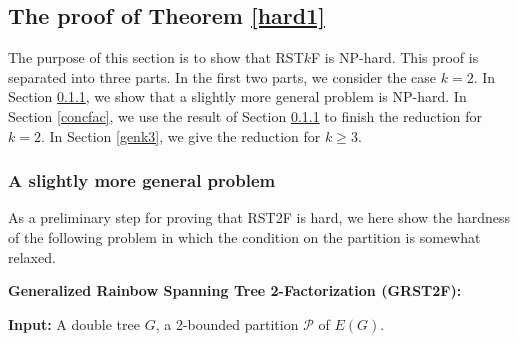\documentclass{article}
\begin{document}
\subsection{The proof of Theorem \ref{hard1}}\label{redtrees}

The purpose of this section is to show that RST$k$F is NP-hard. This proof is separated into three parts. In the first two parts, we consider the case $k=2$. In Section \ref{genk2}, we show that a slightly more general problem is NP-hard. In Section \ref{concfac}, we use the result of Section \ref{genk2} to finish the reduction for $k=2$.  In Section \ref{genk3}, we give the reduction for $k \geq 3$. %



\subsubsection{A slightly more general problem}\label{genk2}

As a preliminary step for proving that RST2F is hard, we here show the hardness of the following problem in which the condition on the partition is somewhat relaxed. 

\medskip 

\noindent \textbf{Generalized Rainbow Spanning Tree 2-Factorization (GRST2F):}
\smallskip

\noindent\textbf{Input:} A double tree $G$, a 2-bounded partition $\mathcal{P}$ of $E(G)$.
\smallskip
\end{document}
